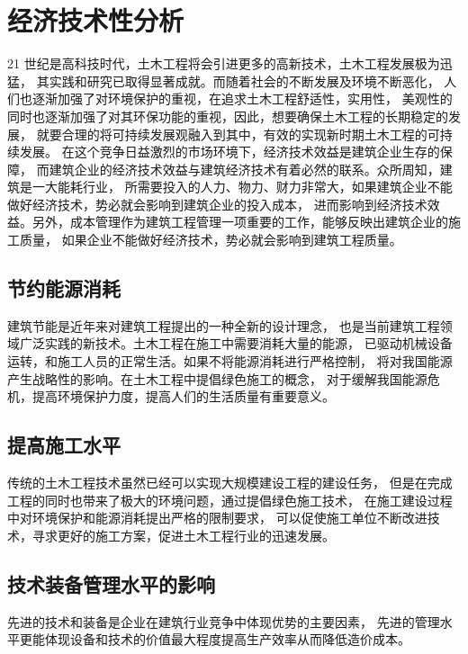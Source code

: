 \section{经济技术性分析}

21 世纪是高科技时代，土木工程将会引进更多的高新技术，土木工程发展极为迅猛， 
其实践和研究已取得显著成就。而随着社会的不断发展及环境不断恶化，
人们也逐渐加强了对环境保护的重视，在追求土木工程舒适性，实用性，
美观性的同时也逐渐加强了对其环保功能的重视，因此，想要确保土木工程的长期稳定的发展，
就要合理的将可持续发展观融入到其中，有效的实现新时期土木工程的可持续发展。
在这个竞争日益激烈的市场环境下，经济技术效益是建筑企业生存的保障，
而建筑企业的经济技术效益与建筑经济技术有着必然的联系。众所周知，建筑是一大能耗行业，
所需要投入的人力、物力、财力非常大，如果建筑企业不能做好经济技术，势必就会影响到建筑企业的投入成本，
进而影响到经济技术效益。另外，成本管理作为建筑工程管理一项重要的工作，能够反映出建筑企业的施工质量，
如果企业不能做好经济技术，势必就会影响到建筑工程质量。 

\subsection{节约能源消耗}

建筑节能是近年来对建筑工程提出的一种全新的设计理念，
也是当前建筑工程领域广泛实践的新技术。土木工程在施工中需要消耗大量的能源，
已驱动机械设备运转，和施工人员的正常生活。如果不将能源消耗进行严格控制，
将对我国能源产生战略性的影响。在土木工程中提倡绿色施工的概念，
对于缓解我国能源危机，提高环境保护力度，提高人们的生活质量有重要意义。 

\subsection{提高施工水平}

传统的土木工程技术虽然已经可以实现大规模建设工程的建设任务，
但是在完成工程的同时也带来了极大的环境问题，通过提倡绿色施工技术，
在施工建设过程中对环境保护和能源消耗提出严格的限制要求，
可以促使施工单位不断改进技术，寻求更好的施工方案，促进土木工程行业的迅速发展。

\subsection{技术装备管理水平的影响}
先进的技术和装备是企业在建筑行业竞争中体现优势的主要因素，
先进的管理水平更能体现设备和技术的价值最大程度提高生产效率从而降低造价成本。
